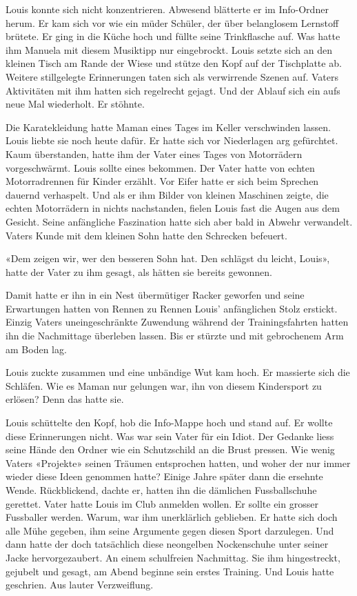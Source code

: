 \sectionbreak

Louis konnte sich nicht konzentrieren. Abwesend blätterte er im Info-Ordner herum. Er kam sich vor wie ein müder Schüler, der über belanglosem Lernstoff brütete. Er ging in die Küche hoch und füllte seine Trinkflasche auf. Was hatte ihm Manuela mit diesem Musiktipp nur eingebrockt. Louis setzte sich an den kleinen Tisch am Rande der Wiese und stütze den Kopf auf der Tischplatte ab. Weitere stillgelegte Erinnerungen
taten sich als verwirrende Szenen auf. Vaters Aktivitäten mit ihm hatten
sich regelrecht gejagt. Und der Ablauf sich ein aufs neue Mal wiederholt. Er stöhnte. 

Die Karatekleidung hatte Maman eines Tages im Keller verschwinden
lassen. Louis liebte sie noch heute dafür. Er hatte sich vor Niederlagen arg gefürchtet.
Kaum überstanden, hatte ihm der Vater eines Tages von Motorrädern
vorgeschwärmt. Louis sollte eines bekommen. Der Vater hatte von echten
Motorradrennen für Kinder erzählt. Vor Eifer hatte er sich beim Sprechen
dauernd verhaspelt. Und als er ihm Bilder von kleinen Maschinen zeigte,
die echten Motorrädern in nichts nachstanden, fielen Louis fast die
Augen aus dem Gesicht. Seine anfängliche Faszination hatte sich aber
bald in Abwehr verwandelt. Vaters Kunde mit dem kleinen Sohn hatte den
Schrecken befeuert.

«Dem zeigen wir, wer den besseren Sohn hat. Den schlägst du leicht,
Louis», hatte der Vater zu ihm gesagt, als hätten sie bereits gewonnen.

Damit hatte er ihn in ein Nest übermütiger Racker geworfen und seine
Erwartungen hatten von Rennen zu Rennen Louis’ anfänglichen Stolz
erstickt. Einzig Vaters uneingeschränkte Zuwendung während der
Trainingsfahrten hatten ihn die Nachmittage überleben lassen. Bis er
stürzte und mit gebrochenem Arm am Boden lag. 

Louis zuckte zusammen und eine unbändige Wut kam hoch. Er massierte sich die Schläfen. Wie es Maman nur gelungen war, ihn von diesem Kindersport zu erlösen? Denn das hatte sie. 
 
Louis schüttelte den Kopf, hob die Info-Mappe hoch und stand auf. 
Er wollte diese Erinnerungen nicht. 
Was war sein Vater für ein Idiot. Der Gedanke liess seine Hände den Ordner wie ein Schutzschild an die Brust pressen.
Wie wenig Vaters «Projekte» seinen Träumen entsprochen hatten, und woher der nur immer wieder diese
Ideen genommen hatte? 
Einige Jahre später dann die ersehnte Wende. Rückblickend, dachte er, hatten ihn die dämlichen 
Fussballschuhe gerettet.
Vater hatte Louis im Club anmelden wollen. Er sollte ein grosser
Fussballer werden. Warum, war ihm unerklärlich geblieben. Er hatte sich doch alle Mühe
gegeben, ihm seine Argumente gegen diesen Sport darzulegen. Und dann
hatte der doch tatsächlich diese neongelben Nockenschuhe unter seiner
Jacke hervorgezaubert. An einem schulfreien Nachmittag. Sie ihm
hingestreckt, gejubelt und gesagt, am Abend beginne sein erstes
Training. Und Louis hatte geschrien. Aus lauter Verzweiflung.

